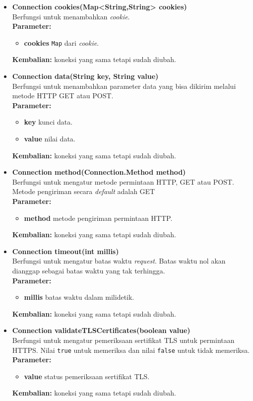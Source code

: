 \documentclass[a4paper,twoside]{article}
\begin{document}
\begin{enumerate}
\begin{enumerate}
\begin{itemize}
	\item \textbf{Connection cookies(Map<String,String> cookies)} \\
		Berfungsi untuk menambahkan \textit{cookie}. \\
		\textbf{Parameter:}
		\begin{itemize}
			\item \textbf{cookies} \texttt{Map} dari \textit{cookie}.
		\end{itemize}
		\textbf{Kembalian:} koneksi yang sama tetapi sudah diubah.
		
		\item \textbf{Connection data(String key, String value)} \\
		Berfungsi untuk menambahkan parameter data yang bisa dikirim melalui metode HTTP GET atau POST. \\
		\textbf{Parameter:}
		\begin{itemize}
			\item \textbf{key} kunci data.
			\item \textbf{value} nilai data.
		\end{itemize}
		\textbf{Kembalian:} koneksi yang sama tetapi sudah diubah.
		
		\item \textbf{Connection method(Connection.Method method)} \\
		Berfungsi untuk mengatur metode permintaan HTTP, GET atau POST. Metode pengiriman secara \textit{default} adalah GET\\
		\textbf{Parameter:}
		\begin{itemize}
			\item \textbf{method} metode pengiriman permintaan HTTP.
		\end{itemize}
		\textbf{Kembalian:} koneksi yang sama tetapi sudah diubah.
		
		\item \textbf{Connection timeout(int millis)} \\
		Berfungsi untuk mengatur batas waktu \textit{request}. Batas waktu nol akan dianggap sebagai batas waktu yang tak terhingga. \\
		\textbf{Parameter:}
		\begin{itemize}
			\item \textbf{millis} batas waktu dalam milidetik.
		\end{itemize}
		\textbf{Kembalian:} koneksi yang sama tetapi sudah diubah.
		
		\item \textbf{Connection validateTLSCertificates(boolean value)} \\
		Berfungsi untuk mengatur pemeriksaan sertifikat TLS untuk permintaan HTTPS. Nilai \texttt{true} untuk memeriksa dan nilai \texttt{false} untuk tidak memeriksa.\\
		\textbf{Parameter:}
		\begin{itemize}
			\item \textbf{value} status pemeriksaan sertifikat TLS.
		\end{itemize}
		\textbf{Kembalian:} koneksi yang sama tetapi sudah diubah.
		

\end{itemize}
\end{enumerate}
\end{enumerate}
\end{document}
